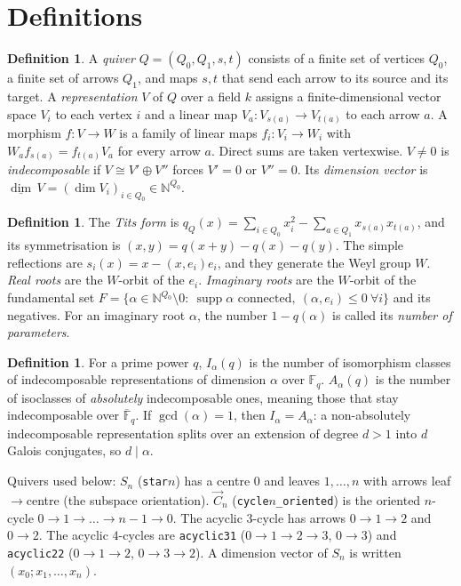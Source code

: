\documentclass[11pt]{article}
\theoremstyle{definition}\newtheorem{definition}[theorem]{Definition}\newtheorem{remark}[theorem]{Remark}\newtheorem{observation}[theorem]{Numerical observation}
\begin{document}
\section{Definitions}
\begin{definition}
A \emph{quiver} $Q=(Q_0,Q_1,s,t)$ consists of a finite set of vertices $Q_0$, a finite set of arrows $Q_1$, and maps $s,t$ that send each arrow
to its source and its target. A \emph{representation} $V$ of $Q$ over a field $k$ assigns a finite-dimensional vector space $V_i$ to each vertex $i$
and a linear map $V_a\colon V_{s(a)}\to V_{t(a)}$ to each arrow $a$. A morphism $f\colon V\to W$ is a family of linear maps
$f_i\colon V_i\to W_i$ with $W_a f_{s(a)}=f_{t(a)}V_a$ for every arrow $a$. Direct sums are taken vertexwise. $V\neq0$ is
\emph{indecomposable} if $V\cong V'\oplus V''$ forces $V'=0$ or $V''=0$. Its \emph{dimension vector} is
$\underline{\dim}\,V=(\dim V_i)_{i\in Q_0}\in\mathbb N^{Q_0}$.
\end{definition}
\begin{definition}
The \emph{Tits form} is $q_Q(x)=\sum_{i\in Q_0}x_i^2-\sum_{a\in Q_1}x_{s(a)}x_{t(a)}$, and its symmetrisation is $(x,y)=q(x+y)-q(x)-q(y)$.
The simple reflections are $s_i(x)=x-(x,e_i)e_i$, and they generate the Weyl group $W$. \emph{Real roots} are the $W$-orbit of the $e_i$. \emph{Imaginary roots} are the
$W$-orbit of the fundamental set $F=\{\alpha\in\mathbb N^{Q_0}\setminus0:\ \operatorname{supp}\alpha \text{ connected},\ (\alpha,e_i)\le0\ \forall i\}$
and its negatives. For an imaginary root $\alpha$, the number $1-q(\alpha)$ is called its \emph{number of parameters}.
\end{definition}
\begin{definition}
For a prime power $q$, $I_\alpha(q)$ is the number of isomorphism classes of indecomposable representations of dimension $\alpha$ over $\mathbb F_q$.
$A_\alpha(q)$ is the number of isoclasses of \emph{absolutely} indecomposable ones, meaning those that stay indecomposable over $\overline{\mathbb F}_q$.
If $\gcd(\alpha)=1$, then $I_\alpha=A_\alpha$: a non-absolutely indecomposable representation splits over an extension of degree $d>1$
into $d$ Galois conjugates, so $d\mid\alpha$.
\end{definition}
Quivers used below: $S_n$ (\texttt{star}$n$) has a centre $0$ and leaves $1,\dots,n$ with arrows leaf$\to$centre (the subspace orientation).
$\vec C_n$ (\texttt{cycle}$n$\texttt{\_oriented}) is the oriented $n$-cycle $0\to1\to\dots\to n-1\to0$. The acyclic $3$-cycle has arrows
$0\to1\to2$ and $0\to2$. The acyclic $4$-cycles are \texttt{acyclic31} ($0\to1\to2\to3$, $0\to3$) and \texttt{acyclic22} ($0\to1\to2$, $0\to3\to2$).
A dimension vector of $S_n$ is written $(x_0;x_1,\dots,x_n)$.
\end{document}
